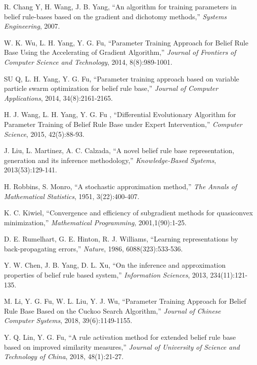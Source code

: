 \documentclass{ieeeaccess}
\begin{document}
\begin{thebibliography}{00}
     R. Chang Y, H. Wang, J. B. Yang, ``An algorithm for training parameters
    in belief rule-bases based on the gradient and dichotomy methods,''
    \emph{Systems Engineering},
    2007.

     W. K. Wu, L. H. Yang, Y. G. Fu, ``Parameter Training Approach for Belief Rule Base Using the Accelerating of Gradient
    Algorithm,''
    \emph{Journal of Frontiers of Computer Science and Technology},
    2014, 8(8):989-1001.

     SU Q, L. H. Yang, Y. G. Fu, ``Parameter training approach based on variable particle swarm optimization
    for belief rule base,''
    \emph{Journal of Computer Applications},
    2014, 34(8):2161-2165.

     H. J. Wang, L. H. Yang, Y. G. Fu , ``Differential Evolutionary Algorithm for Parameter Training of Belief Rule Base under Expert Intervention,''
    \emph{Computer Science},
    2015, 42(5):88-93.

     J. Liu, L. Martinez, A. C. Calzada, ``A novel belief rule base representation, generation and its inference methodology,''
    \emph{Knowledge-Based Systems},
    2013(53):129-141.

     H. Robbins, S. Monro, ``A stochastic approximation method,''
    \emph{The Annals of Mathematical Statistics},
    1951, 3(22):400-407.

     K. C. Kiwiel, ``Convergence and efficiency of subgradient methods for quasiconvex minimization,''
    \emph{Mathematical Programming},
    2001,1(90):1-25.

     D. E. Rumelhart, G. E. Hinton, R. J. Williams, ``Learning representations
    by back-propagating errors,''
    \emph{Nature},
    1986, 6088(323):533-536.

     Y. W. Chen, J. B. Yang, D. L. Xu, ``On the inference and approximation properties of belief rule based system,''
    \emph{Information Sciences}, 2013, 234(11):121-135.

     M. Li, Y. G. Fu, W. L. Liu, Y. J. Wu, ``Parameter Training  Approach for Belief Rule Base Based on the Cuckoo Search Algorithm,''
    \emph{Journal of Chinese Computer Systems}, 2018, 39(6):1149-1155.

     Y. Q. Lin, Y. G. Fu, ``A rule activation method for extended belief rule base based on improved similarity measures,''
    \emph{Journal of University of Science and Technology of China},
    2018, 48(1):21-27.


\end{thebibliography}
\end{document}
